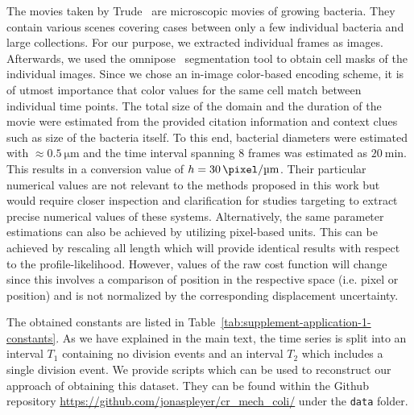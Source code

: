 The movies taken by Trude~\cite{Trude1982} are microscopic movies of growing bacteria.
They contain various scenes covering cases between only a few individual bacteria and large
collections.
For our purpose, we extracted individual frames as images.
Afterwards, we used the omnipose~\cite{Cutler2022} segmentation tool to obtain cell masks of the
individual images.
Since we chose an in-image color-based encoding scheme, it is of utmost importance
that color values
for the same cell match between individual time points.
The total size of the domain and the duration of the movie were estimated from the
provided citation
information and context clues such as size of the bacteria itself.
To this end, bacterial diameters were estimated with $\approx\SI{0.5}{\micro\metre}$
and the time
interval spanning $8$ frames was estimated as $\SI{20}{\minute}$.
This results in a conversion value of $h=\SI{30}{\pixel\per\micro\metre}$.
Their particular numerical values are not relevant to the methods proposed in this
work but would
require closer inspection and clarification for studies targeting to extract precise numerical
values of these systems.
Alternatively, the same parameter estimations can also be achieved by utilizing pixel-based
units.
This can be achieved by rescaling all length which will provide identical results
with respect to
the profile-likelihood.
However, values of the raw cost function will change since this involves a comparison
of position in
the respective space (i.e. pixel or position) and is not normalized by the corresponding
displacement uncertainty.

The obtained constants are listed in Table~\ref{tab:supplement-application-1-constants}.
As we have explained in the main text, the time series is split into an interval
$T_1$ containing no
division events and an interval $T_2$ which includes a single division event.
We provide scripts which can be used to reconstruct our approach of obtaining this dataset.
They can be found within the Github repository
\url{https://github.com/jonaspleyer/cr_mech_coli/}
under the \texttt{data} folder.

